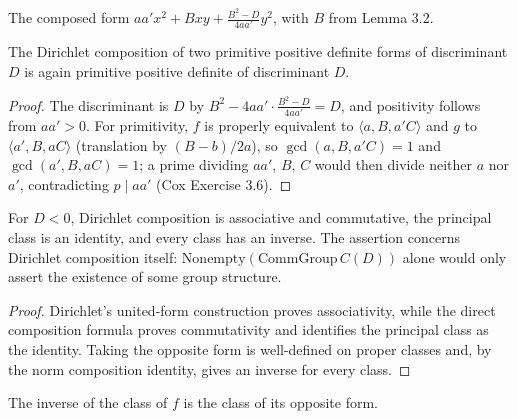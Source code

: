 \begin{definition}
  \label{def:dirichlet_form}
  \leanok
  The composed form $a a' x^2 + B x y + \tfrac{B^2-D}{4aa'} y^2$, with $B$ from
  Lemma 3.2.
\end{definition}

\begin{proposition}
  \label{prop:p3_8}
  \leanok
  The Dirichlet composition of two primitive positive definite forms of
  discriminant $D$ is again primitive positive definite of discriminant $D$.
\end{proposition}
\begin{proof}\leanok
{}
The discriminant is $D$ by $B^2-4aa'\cdot\frac{B^2-D}{4aa'}=D$,
and positivity follows from $aa'>0$. For primitivity, $f$ is properly equivalent to
$\langle a,B,a'C\rangle$
and $g$ to $\langle a',B,aC\rangle$ (translation by $(B-b)/2a$), so $\gcd(a,B,a'C)=1$ and
$\gcd(a',B,aC)=1$; a prime dividing $aa'$, $B$, $C$ would then divide neither $a$ nor $a'$,
contradicting $p\mid aa'$ (Cox Exercise 3.6).
\end{proof}

\begin{theorem}
  \label{thm:form_class_group_is_group}
  \leanok
  For $D<0$, Dirichlet composition is associative and commutative, the principal
  class is an identity, and every class has an inverse. The assertion concerns
  Dirichlet composition itself: $\mathrm{Nonempty}(\mathrm{CommGroup}\,C(D))$
  alone would only assert the existence of some group structure.
\end{theorem}
\begin{proof}\leanok
Dirichlet's united-form construction proves associativity, while the direct
composition formula proves commutativity and identifies the principal class as
the identity. Taking the opposite form is well-defined on proper classes and,
by the norm composition identity, gives an inverse for every class.
\end{proof}

\begin{theorem}
  \label{thm:t3_9_inverse}
  \leanok
  The inverse of the class of $f$ is the class of its opposite form.
\end{theorem}

